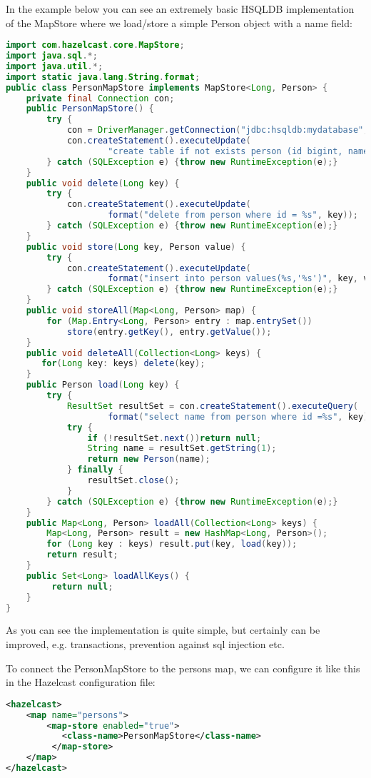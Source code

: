In the example below you can see an extremely basic HSQLDB implementation of the MapStore where we load/store a simple Person object with a name field:
\begin{lstlisting}[language=java]
import com.hazelcast.core.MapStore;
import java.sql.*;
import java.util.*;
import static java.lang.String.format;
public class PersonMapStore implements MapStore<Long, Person> {
    private final Connection con;
    public PersonMapStore() {
        try {
            con = DriverManager.getConnection("jdbc:hsqldb:mydatabase", "SA", "");
            con.createStatement().executeUpdate(
                    "create table if not exists person (id bigint, name varchar(45))");
        } catch (SQLException e) {throw new RuntimeException(e);}
    }
    public void delete(Long key) {
        try {
            con.createStatement().executeUpdate(
                    format("delete from person where id = %s", key));
        } catch (SQLException e) {throw new RuntimeException(e);}
    }
    public void store(Long key, Person value) {
        try {
            con.createStatement().executeUpdate(
                    format("insert into person values(%s,'%s')", key, value.name));
        } catch (SQLException e) {throw new RuntimeException(e);}
    }
    public void storeAll(Map<Long, Person> map) {
        for (Map.Entry<Long, Person> entry : map.entrySet())
            store(entry.getKey(), entry.getValue());
    }
    public void deleteAll(Collection<Long> keys) {
       for(Long key: keys) delete(key);
    }
    public Person load(Long key) {
        try {
            ResultSet resultSet = con.createStatement().executeQuery(
                    format("select name from person where id =%s", key));
            try {
                if (!resultSet.next())return null;
                String name = resultSet.getString(1);
                return new Person(name);
            } finally {
                resultSet.close();
            }
        } catch (SQLException e) {throw new RuntimeException(e);}
    }
    public Map<Long, Person> loadAll(Collection<Long> keys) {
        Map<Long, Person> result = new HashMap<Long, Person>();
        for (Long key : keys) result.put(key, load(key));
        return result;
    }
    public Set<Long> loadAllKeys() {
         return null;
    }
}
\end{lstlisting}
As you can see the implementation is quite simple, but certainly can be improved, e.g. transactions, prevention against sql injection etc. 

To connect the PersonMapStore to the persons map, we can configure it like this in the Hazelcast configuration file:
\begin{lstlisting}[language=xml]
<hazelcast>
    <map name="persons">
        <map-store enabled="true">
           <class-name>PersonMapStore</class-name>
         </map-store>
    </map>
</hazelcast>
\end{lstlisting}

